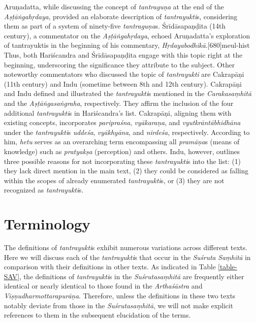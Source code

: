 Aruṇadatta, while discussing the concept of \emph{tantraguṇa} at the end of the \emph{Aṣṭāṅgahṛdaya}, provided an elaborate description of \emph{tantrayukti}s, considering them as part of a system of ninety-five \emph{tantraguṇa}s. Śrīdāsapaṇḍita (14th century), a commentator on the \emph{Aṣṭāṅgahṛdaya}, echoed Aruṇadatta's exploration of tantrayuktis in the beginning of his commentary, \emph{Hṛdayabodhikā}.[680]{meul-hist} Thus, both Hariścandra and Śrīdāsapaṇḍita engage with this topic right at the beginning, underscoring the significance they attribute to the subject. Other noteworthy commentators who discussed the topic of \emph{tantrayukti} are Cakrapāṇi (11th century) and Indu (sometime between 8th and 12th century). Cakrapāṇi and Indu defined and illustrated the \emph{tantrayukti}s mentioned in the \emph{Carakasaṃhitā} and the \emph{Aṣṭāṅgasaṅgraha}, respectively. They affirm the inclusion of the four additional \emph{tantrayukti}s in Hariścandra's list. Cakrapāṇi, aligning them with existing concepts, incorporates \emph{paripraśna}, \emph{vyākaraṇa}, and \emph{vyutkrāntābhidhāna} under the \emph{tantrayukti}s \emph{uddeśa}, \emph{vyākhyāna}, and \emph{nirdeśa}, respectively. According to him, \emph{hetu} serves as an overarching term encompassing all \emph{pramāṇa}s (means of knowledge) such as \emph{pratyakṣa} (perception) and others. Indu, however, outlines three possible reasons for not incorporating these \emph{tantrayukti}s into the list: (1) they lack direct mention in the main text, (2) they could be considered as falling within the scopes of already enumerated \emph{tantrayukti}s, or (3) they are not recognized as \emph{tantrayukti}s.

\section{Terminology}

The definitions of \emph{tantrayukti}s exhibit numerous variations across different texts. Here we will discuss each of the \emph{tantrayukti}s that occur in the \emph{Suśruta Saṃhitā} in comparison with their definitions in other texts. As indicated in Table \ref{table-SAV}, the definitions of \emph{tantrayukti}s in the \emph{Suśrutasaṃhitā} are frequently either identical or nearly identical to those found in the \emph{Arthaśāstra} and \emph{Viṣṇudharmottarapurāṇa}. Therefore, unless the definitions in these two texts notably deviate from those in the \emph{Suśrutasaṃhitā}, we will not make explicit references to them in the subsequent elucidation of the terms.


